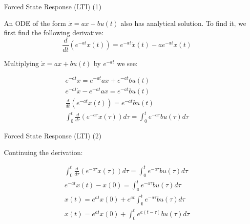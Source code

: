 \documentclass{beamer}
\begin{document}
\begin{frame}{Forced State Response (LTI) (1)}
	\begin{flushleft}
		
		An ODE of the form $\dot x = a x + bu(t)$ also has analytical solution. To find it, we first find the following derivative:
		\begin{equation}
			\frac{d}{dt} \left( e^{-at} x(t) \right) = e^{-at} \dot x(t) - a e^{-at} x(t)
		\end{equation}
		
		Multiplying $\dot x = a x + bu(t)$ by $e^{-at}$ we see:
		
		\begin{align}
			e^{-at} \dot x = e^{-at} a x + e^{-at} bu(t)
			\\
			e^{-at} \dot x -  e^{-at} a x= e^{-at} bu(t)
			\\
			\frac{d}{dt} \left( e^{-at} x(t) \right) = e^{-at} bu(t)
			\\
			\int_{0}^{t} \frac{d}{d\tau} \left( e^{-a\tau} x(\tau) \right) d\tau = 	\int_{0}^{t}  e^{-a\tau} bu(\tau) d\tau
		\end{align}
		
		
		
	\end{flushleft}
\end{frame}



\begin{frame}{Forced State Response (LTI) (2)}
	\begin{flushleft}
		
		Continuing the derivation:
		
		\begin{align}
			\int_{0}^{t} \frac{d}{d\tau} \left( e^{-a\tau} x(\tau) \right) d\tau = 	\int_{0}^{t}  e^{-a\tau} bu(\tau) d\tau
			\\
			e^{-at} x(t) - x(0) = \int_{0}^{t}  e^{-a\tau} bu(\tau) d\tau
			\\
			x(t) = e^{at} x(0) + e^{at} \int_{0}^{t}  e^{-a\tau} bu(\tau) d\tau
			\\
			x(t) = e^{at} x(0) + \int_{0}^{t}  e^{a(t-\tau)} bu(\tau) d\tau
		\end{align}
		
		
		
	\end{flushleft}
\end{frame}
\end{document}
